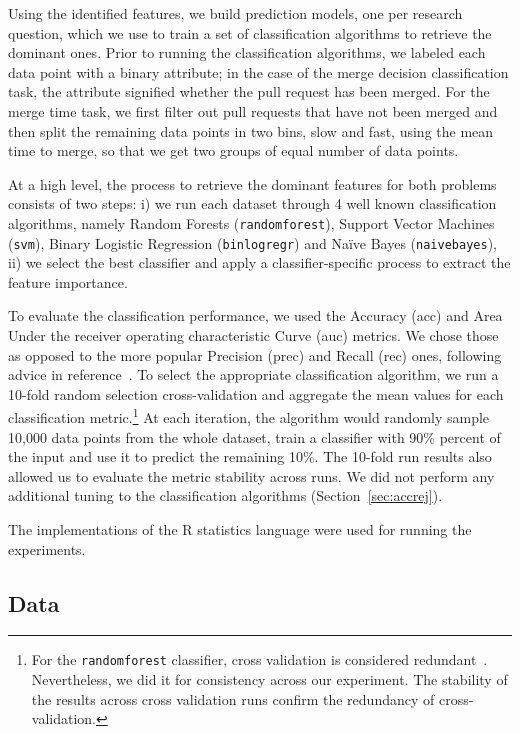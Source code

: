 \documentclass{acm_proc_article-sp}
\begin{document}
Using the identified features, we build prediction models, one per research
question, which we use to train a set of classification algorithms to retrieve
the dominant ones. Prior to running the classification algorithms, we labeled
each data point with a binary attribute; in the case of the \textsf{merge
decision} classification task, the attribute signified whether the pull request
has been merged. For the \textsf{merge time} task, we first filter out pull
requests that have not been merged and then split the remaining data points in
two bins, slow and fast, using the mean time to merge, so that we get two
groups of equal number of data points.

At a high level, the process to retrieve the dominant features for both
problems consists of two steps: i) we run each dataset through 4 well known
classification algorithms, namely Random Forests (\texttt{randomforest}),
Support Vector Machines (\texttt{svm}), Binary Logistic Regression
(\texttt{binlogregr}) and Na\"ive Bayes (\texttt{naivebayes}), ii) we select
the best classifier and apply a classifier-specific process to extract the
feature importance. 

To evaluate the classification performance, we used the Accuracy ({\sc acc}) and
Area Under the receiver operating characteristic Curve ({\sc auc}) metrics. We
chose those as opposed to the more popular Precision ({\sc prec}) and Recall
({\sc rec}) ones, following advice in reference~\cite{Lessm08}. To select the
appropriate classification algorithm, we run a 10-fold random selection
cross-validation and aggregate the mean values for each classification
metric.\footnote{For the \texttt{randomforest} classifier, cross validation is
considered redundant~\cite{Breim01}. Nevertheless, we did it for consistency
across our experiment. The stability of the results across cross validation runs
confirm the redundancy of cross-validation.} At each iteration, the algorithm
would randomly sample 10,000 data points from the whole dataset, train a
classifier with 90\% percent of the input and use it to predict the remaining
10\%. The 10-fold run results also allowed us to evaluate the metric stability
across runs. We did not perform any additional tuning to the classification
algorithms (Section~\ref{sec:accrej}).

The implementations of the R statistics language were used for running the experiments.

\subsection{Data}
\label{sec:expdata} 
\end{document}
